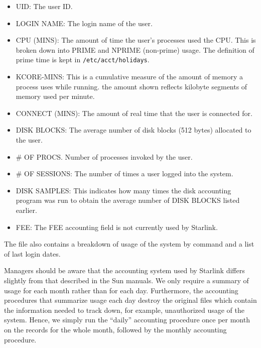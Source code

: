 \begin{itemize}

\item UID: The user ID.

\item LOGIN NAME: The login name of the user.

\item CPU (MINS): The amount of time the user's processes used the CPU. This
is broken down into PRIME and NPRIME (non-prime) usage. The definition of
prime time is kept in {\tt /etc/acct/holidays}.

\item KCORE-MINS: This is a cumulative measure of the amount of memory a process
uses while running. the amount shown reflects kilobyte segments of memory used
per minute.

\item CONNECT (MINS): The amount of real time that the user is connected for.

\item DISK BLOCKS: The average number of disk blocks (512 bytes) allocated to 
the user.

\item \# OF PROCS. Number of processes invoked by the user. 

\item \# OF SESSIONS: The number of times a user logged into the system.

\item DISK SAMPLES: This indicates how many times the disk accounting program
was run to obtain the average number of DISK BLOCKS listed earlier.

\item FEE: The FEE accounting field is not currently used by Starlink.

\end{itemize}

The file also contains a breakdown of usage of the system by command and a
list of last login dates.

Managers should be aware that the accounting system used by Starlink differs 
slightly from that described in the Sun manuals. We only require a summary 
of usage for each month rather than for each day. Furthermore, the accounting
procedures that summarize usage each day destroy the original files which contain the 
information needed to track down, for example, unauthorized usage of the 
system. Hence, we simply run the ``daily'' accounting procedure once per
month on the records for the whole month, followed by the monthly accounting
procedure.

